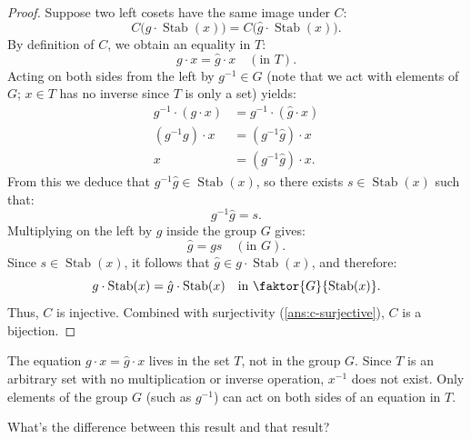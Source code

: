 \begin{proofWrapper}
\begin{content}
\begin{proof}
Suppose two left cosets have the same image under $C$:
\[
C\bigl(g \cdot \operatorname{Stab}(x)\bigr) = C\bigl(\hat{g} \cdot \operatorname{Stab}(x)\bigr).
\]
By definition of $C$, we obtain an equality in $T$:
\[
g \cdot x = \hat{g} \cdot x \quad (\text{in } T).
\]
Acting on both sides from the left by $g^{-1} \in G$ (note that we act with elements of $G$; $x \in T$ has no inverse since $T$ is only a set) yields:
\begin{align*}
g^{-1} \cdot (g \cdot x) &= g^{-1} \cdot (\hat{g} \cdot x) \\
(g^{-1} g) \cdot x &= (g^{-1} \hat{g}) \cdot x \\
x &= (g^{-1} \hat{g}) \cdot x.
\end{align*}
From this we deduce that $g^{-1} \hat{g} \in \operatorname{Stab}(x)$, so there exists $s \in \operatorname{Stab}(x)$ such that:
\[
g^{-1} \hat{g} = s.
\]
Multiplying on the left by $g$ inside the group $G$ gives:
\[
\hat{g} = g s \quad (\text{in } G).
\]
Since $s \in \operatorname{Stab}(x)$, it follows that $\hat{g} \in g \cdot \operatorname{Stab}(x)$, and therefore:
\[
g \cdot \operatorname{Stab}(x) = \hat{g} \cdot \operatorname{Stab}(x) \quad \text{in } \faktor{G}{\operatorname{Stab}(x)}.
\]
Thus, $C$ is injective. Combined with surjectivity (\cref{ans:c-surjective}), $C$ is a bijection.
\end{proof}

\begin{steps}
The equation $g \cdot x = \hat{g} \cdot x$ lives in the set $T$, not in the group $G$. Since $T$ is an arbitrary set with no multiplication or inverse operation, $x^{-1}$ does not exist. Only elements of the group $G$ (such as $g^{-1}$) can act on both sides of an equation in $T$.
\end{steps}
\end{content}
\end{proofWrapper}

\begin{student}
What's the difference between this result and that result?
\end{student}

